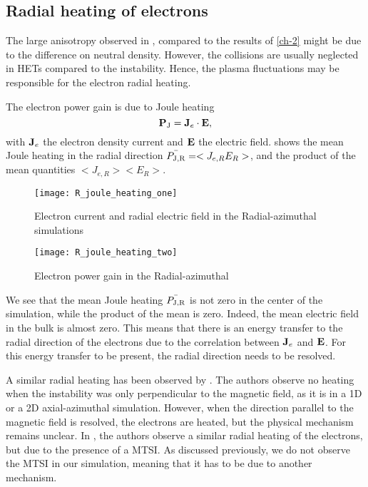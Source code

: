 \subsection{Radial heating of electrons} \label{subsec-radial-heating}
The large anisotropy observed in , compared to the results of \cref{ch-2} might be due to the difference on neutral density.
However, the collisions are usually neglected in \ac{HET}s compared to the instability.
Hence, the plasma fluctuations may be responsible for the electron radial heating.

The electron power gain is due to Joule heating
\begin{equation} \label{eq-epower}
    {\mathbf P_{\rm J}} = {\mathbf J_e} \cdot {\mathbf E},
\end{equation}
with ${\mathbf J_e}$ the electron density current and ${\mathbf E}$ the electric field.
 shows the mean Joule heating in the radial direction $\bar{P_{\rm J, R}} = < J_{e, R} E_R >$, and the product of the mean quantities $< J_{e, R}>  < E_R >$.

\begin{figure}[hbtp]
  \centering
  \texttt{[image: R\_joule\_heating\_one]}
  \caption{Electron current and radial electric field in the Radial-azimuthal simulations }
  \label{fig-epower_radialone}
\end{figure}



\begin{figure}[hbtp]
  \centering
  \texttt{[image: R\_joule\_heating\_two]}
  \caption{Electron power gain in the Radial-azimuthal }
  \label{fig-epower_radial}
\end{figure}

We see that the mean Joule heating $\bar{P_{\rm J, R}}$ is not zero in the center of the simulation, while the product of the mean is zero.
Indeed, the mean electric field in the bulk is almost zero.
This means that there is an energy transfer to the radial direction of the electrons due to the correlation between ${\mathbf J_e}$ and ${\mathbf E}$.
For this energy transfer to be present, the radial direction needs to be resolved.

A similar radial heating has been observed by \citet{heron2013}.
The authors observe no heating when the instability was only perpendicular to the magnetic field, as it is in a \ac{1D} or a \ac{2D} axial-azimuthal simulation.
However, when the direction parallel to the magnetic field is resolved, the electrons are heated, but the physical mechanism remains unclear.
In \citet{janhunen}, the authors observe a similar radial heating of the electrons, but due to the presence of a \ac{MTSI}.
As discussed previously, we do not observe the \ac{MTSI} in our simulation, meaning that it has to be due to another mechanism.



